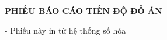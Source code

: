 \thispagestyle{empty}
\vspace{1.5cm}
\begin{center}
    {\fontsize{13}{16}\selectfont\bfseries PHIẾU BÁO CÁO TIẾN ĐỘ ĐỒ ÁN}
\end{center}

\vspace{1.5cm}

\begin{center}
    {\fontsize{13}{16}\selectfont - Phiếu này in từ hệ thống số hóa}
\end{center}

\newpage
